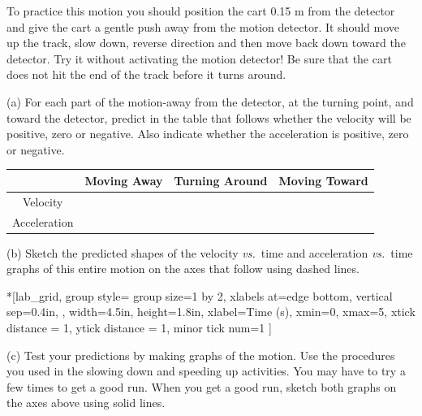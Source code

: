To practice this motion you should position the cart 0.15 m from the detector
and give the cart a gentle push away from the motion detector. It should move
up the track, slow down, reverse direction and then move back down toward the
detector. Try it without activating the motion detector! Be sure that the cart
does not hit the end of the track before it turns around. 


(a) For each part of the motion-away from the detector, at the turning point,
and toward the detector, predict in the table that follows whether the velocity
will be positive, zero or negative. Also indicate whether the acceleration is
positive, zero or negative.

\vspace{0.3cm}
{\centering \begin{tabular}{|c|c|c|c|}
\hline 
&
Moving Away&
Turning Around&
Moving Toward\\
\hline 
Velocity&
&
&
\\
\hline 
Acceleration&
&
&
\\
\hline 
\end{tabular}\par}
\vspace{0.3cm}

(b) Sketch the predicted shapes of the velocity \textit{vs.}~time and acceleration 
\textit{vs.}~time graphs of this entire motion on the axes that follow using dashed lines.

\begin{lab_groupplot}*{}[lab_grid,
	group style={
		group size=1 by 2,
		xlabels at=edge bottom,
		vertical sep=0.4in,
		},
	width=4.5in,  height=1.8in,
	xlabel=Time (s),
	xmin=0, xmax=5,
	xtick distance = 1, 
	ytick distance = 1, 
	minor tick num=1
	]
\nextgroupplot[
	ymin=-1,ymax=1, 
	ylabel={Velocity (m/s)},
	]
\nextgroupplot[
	ymin=-1,ymax=1, 
	ylabel={Acceleration (m/s$^2$)},
	]
\end{lab_groupplot}

(c) Test your predictions by making graphs of the motion. Use the procedures
you used in the slowing down and speeding up activities. You may have to try
a few times to get a good run. When you get a good run, sketch both graphs on the axes above using solid lines.

